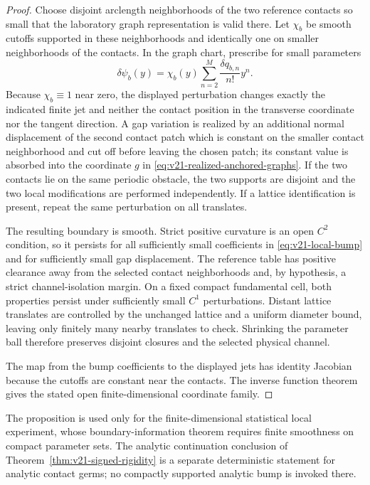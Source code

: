 \begin{proof}
Choose disjoint arclength neighborhoods of the two reference contacts so
small that the laboratory graph representation is valid there.  Let
$\chi_b$ be smooth cutoffs supported in these neighborhoods and identically
one on smaller neighborhoods of the contacts.  In the graph chart, prescribe
for small parameters
\begin{equation}\label{eq:v21-local-bump}
 \delta\psi_b(y)
 =\chi_b(y)\sum_{n=2}^M\frac{\delta q_{b,n}}{n!}y^n.
\end{equation}
Because $\chi_b\equiv1$ near zero, the displayed perturbation changes exactly
the indicated finite jet and neither the contact position in the transverse
coordinate nor the tangent direction.  A gap variation is realized by an
additional normal displacement of the second contact patch which is constant
on the smaller contact neighborhood and cut off before leaving the chosen
patch; its constant value is absorbed into the coordinate $g$ in
\eqref{eq:v21-realized-anchored-graphs}.  If the two contacts lie on the same
periodic obstacle, the two supports are disjoint and the two local
modifications are performed independently.  If a lattice identification is
present, repeat the same perturbation on all translates.

The resulting boundary is smooth.  Strict positive curvature is an open
$C^2$ condition, so it persists for all sufficiently small coefficients in
\eqref{eq:v21-local-bump} and for sufficiently small gap displacement.  The
reference table has positive clearance away from the selected contact
neighborhoods and, by hypothesis, a strict channel-isolation margin.  On a
fixed compact fundamental cell, both properties persist under sufficiently
small $C^1$ perturbations.  Distant lattice translates are controlled by the
unchanged lattice and a uniform diameter bound, leaving only finitely many
nearby translates to check.  Shrinking the parameter ball therefore preserves
disjoint closures and the selected physical channel.

The map from the bump coefficients to the displayed jets has identity
Jacobian because the cutoffs are constant near the contacts.  The inverse
function theorem gives the stated open finite-dimensional coordinate family.
\end{proof}

\begin{remark}
The proposition is used only for the finite-dimensional statistical local
experiment, whose boundary-information theorem requires finite smoothness on
compact parameter sets.  The analytic continuation conclusion of
Theorem~\ref{thm:v21-signed-rigidity} is a separate deterministic statement
for analytic contact germs; no compactly supported analytic bump is invoked
there.
\end{remark}
